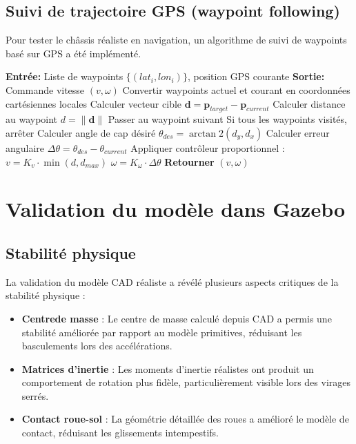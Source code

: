 \documentclass[a4paper,12pt]{report}
\begin{document}
\subsection{Suivi de trajectoire GPS (waypoint following)}

Pour tester le châssis réaliste en navigation, un algorithme de suivi de waypoints basé sur GPS a été implémenté.

\begin{algorithm}[htbp]
\caption{Algorithme de suivi de waypoints GPS}
\label{alg:waypoint_following}
\begin{algorithmic}[1]
\State \textbf{Entrée:} Liste de waypoints $\{(lat_i, lon_i)\}$, position GPS courante
\State \textbf{Sortie:} Commande vitesse $(v, \omega)$
\State Convertir waypoints actuel et courant en coordonnées cartésiennes locales
\State Calculer vecteur cible $\mathbf{d} = \mathbf{p}_{target} - \mathbf{p}_{current}$
\State Calculer distance au waypoint $d = \|\mathbf{d}\|$
    \State Passer au waypoint suivant
    \State Si tous les waypoints visités, arrêter
\EndIf
\State Calculer angle de cap désiré $\theta_{des} = \arctan2(d_y, d_x)$
\State Calculer erreur angulaire $\Delta\theta = \theta_{des} - \theta_{current}$
\State Appliquer contrôleur proportionnel :
\State $v = K_v \cdot \min(d, d_{max})$
\State $\omega = K_\omega \cdot \Delta\theta$
\State \textbf{Retourner} $(v, \omega)$
\end{algorithmic}
\end{algorithm}

\section{Validation du modèle dans Gazebo}

\subsection{Stabilité physique}

La validation du modèle CAD réaliste a révélé plusieurs aspects critiques de la stabilité physique :

\begin{itemize}
    \item \textbf{Centrede masse} : Le centre de masse calculé depuis CAD a permis une stabilité améliorée par rapport au modèle primitives, réduisant les basculements lors des accélérations.
    \item \textbf{Matrices d'inertie} : Les moments d'inertie réalistes ont produit un comportement de rotation plus fidèle, particulièrement visible lors des virages serrés.
    \item \textbf{Contact roue-sol} : La géométrie détaillée des roues a amélioré le modèle de contact, réduisant les glissements intempestifs.
\end{itemize}
\end{document}
